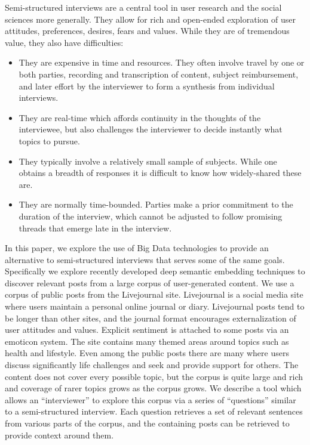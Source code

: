 \documentclass{sigchi}
\begin{document}
Semi-structured interviews are a central tool in user research and the social sciences more generally.
They allow for rich and open-ended exploration of user attitudes, preferences, desires, fears and values. 
While they are of tremendous value, they also have difficulties:

\begin{itemize}
\item They are expensive in time and resources. They often involve travel by one or both parties,
  recording and transcription of content, subject reimbursement, and later effort by the interviewer
  to form a synthesis from individual interviews.
\item They are real-time which affords continuity in the thoughts of the interviewee, but also challenges
  the interviewer to decide instantly what topics to pursue.
\item They typically involve a relatively small sample of subjects. While one obtains a breadth of
  responses it is difficult to know how widely-shared these are.
\item They are normally time-bounded. Parties make a prior commitment to the duration of the interview,
  which cannot be adjusted to follow promising threads that emerge late in the interview.
\end{itemize}

In this paper, we explore the use of Big Data technologies to provide an alternative to
semi-structured interviews that serves some of the same goals. Specifically we explore recently
developed deep semantic embedding techniques to discover relevant posts from a large corpus of
user-generated content. We use a corpus of public posts from the Livejournal site.  Livejournal is a
social media site where users maintain a personal online journal or diary. Livejournal posts tend to
be longer than other sites, and the journal format encourages externalization of user attitudes and
values. Explicit sentiment is attached to some posts via an emoticon system. The site contains many
themed areas around topics such as health and lifestyle.  Even among the public posts there are many
where users discuss significantly life challenges and seek and provide support for others. The
content does not cover every possible topic, but the corpus is quite large and rich and coverage of
rarer topics grows as the corpus grows.  We describe a tool which allows an ``interviewer'' to
explore this corpus via a series of ``questions'' similar to a semi-structured interview. Each
question retrieves a set of relevant sentences from various parts of the corpus, and the containing
posts can be retrieved to provide context around them.
\end{document}
